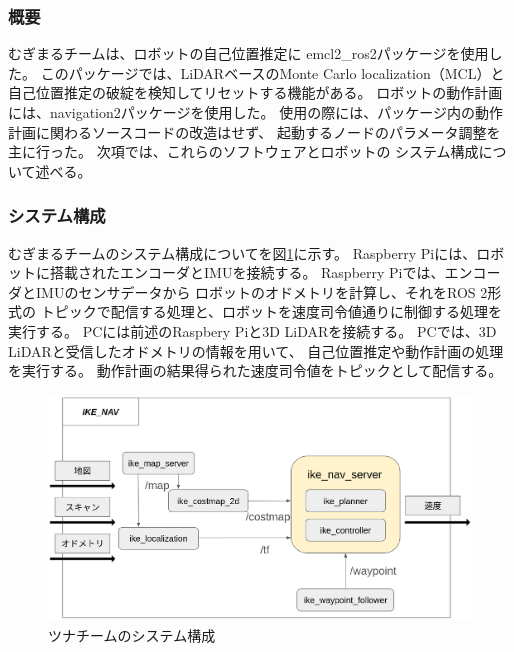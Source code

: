 \subsubsection{概要}
むぎまるチームは、ロボットの自己位置推定に
emcl2\_ros2パッケージ\cite{emcl2_ros2}を使用した。
このパッケージでは、LiDARベースのMonte Carlo localization（MCL）と
自己位置推定の破綻を検知してリセット\cite{ueda2004iros}する機能がある。
ロボットの動作計画には、navigation2パッケージ\cite{nav2}を使用した。
使用の際には、パッケージ内の動作計画に関わるソースコードの改造はせず、
起動するノードのパラメータ調整を主に行った。
次項では、これらのソフトウェアとロボットの
システム構成について述べる。

\subsubsection{システム構成}
むぎまるチームのシステム構成についてを図\ref{fig:mugimaru_system}に示す。
Raspberry Piには、ロボットに搭載されたエンコーダとIMUを接続する。
Raspberry Piでは、エンコーダとIMUのセンサデータから
ロボットのオドメトリを計算し、それをROS 2形式の
トピックで配信する処理と、ロボットを速度司令値通りに制御する処理を実行する。
PCには前述のRaspbery Piと3D LiDARを接続する。
PCでは、3D LiDARと受信したオドメトリの情報を用いて、
自己位置推定や動作計画の処理を実行する。
動作計画の結果得られた速度司令値をトピックとして配信する。



\begin{figure}[h]
  \begin{center}
    \includegraphics[width=1.0\linewidth]{figs/ike_nav.pdf}
    \caption{ツナチームのシステム構成}
    \label{fig:mugimaru_system}
  \end{center}
\end{figure}

